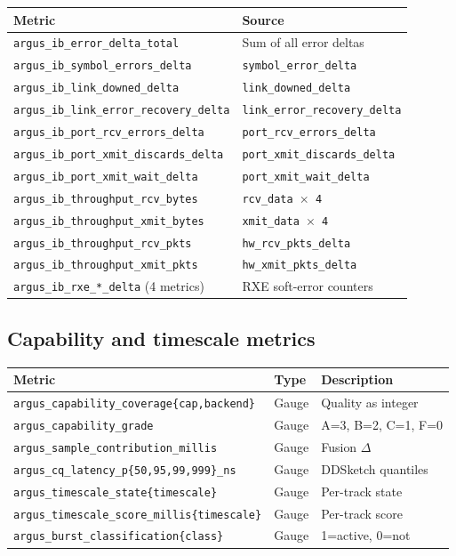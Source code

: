 \documentclass[11pt]{article}
\begin{document}
\begin{center}
\small
\begin{tabular}{ll}
\toprule
Metric & Source \\
\midrule
\texttt{argus\_ib\_error\_delta\_total}             & Sum of all error deltas \\
\texttt{argus\_ib\_symbol\_errors\_delta}            & \texttt{symbol\_error\_delta} \\
\texttt{argus\_ib\_link\_downed\_delta}              & \texttt{link\_downed\_delta} \\
\texttt{argus\_ib\_link\_error\_recovery\_delta}     & \texttt{link\_error\_recovery\_delta} \\
\texttt{argus\_ib\_port\_rcv\_errors\_delta}         & \texttt{port\_rcv\_errors\_delta} \\
\texttt{argus\_ib\_port\_xmit\_discards\_delta}      & \texttt{port\_xmit\_discards\_delta} \\
\texttt{argus\_ib\_port\_xmit\_wait\_delta}          & \texttt{port\_xmit\_wait\_delta} \\
\texttt{argus\_ib\_throughput\_rcv\_bytes}           & \texttt{rcv\_data $\times$ 4} \\
\texttt{argus\_ib\_throughput\_xmit\_bytes}          & \texttt{xmit\_data $\times$ 4} \\
\texttt{argus\_ib\_throughput\_rcv\_pkts}            & \texttt{hw\_rcv\_pkts\_delta} \\
\texttt{argus\_ib\_throughput\_xmit\_pkts}           & \texttt{hw\_xmit\_pkts\_delta} \\
\texttt{argus\_ib\_rxe\_*\_delta} (4 metrics)       & RXE soft-error counters \\
\bottomrule
\end{tabular}
\end{center}

\subsection{Capability and timescale metrics}

\begin{center}
\small
\begin{tabular}{lll}
\toprule
Metric & Type & Description \\
\midrule
\texttt{argus\_capability\_coverage\{cap,backend\}} & Gauge & Quality as integer \\
\texttt{argus\_capability\_grade}                     & Gauge & A=3, B=2, C=1, F=0 \\
\texttt{argus\_sample\_contribution\_millis}          & Gauge & Fusion $\Delta$ \\
\texttt{argus\_cq\_latency\_p\{50,95,99,999\}\_ns}   & Gauge & DDSketch quantiles \\
\texttt{argus\_timescale\_state\{timescale\}}         & Gauge & Per-track state \\
\texttt{argus\_timescale\_score\_millis\{timescale\}} & Gauge & Per-track score \\
\texttt{argus\_burst\_classification\{class\}}        & Gauge & 1=active, 0=not \\
\bottomrule
\end{tabular}
\end{center}
\end{document}

